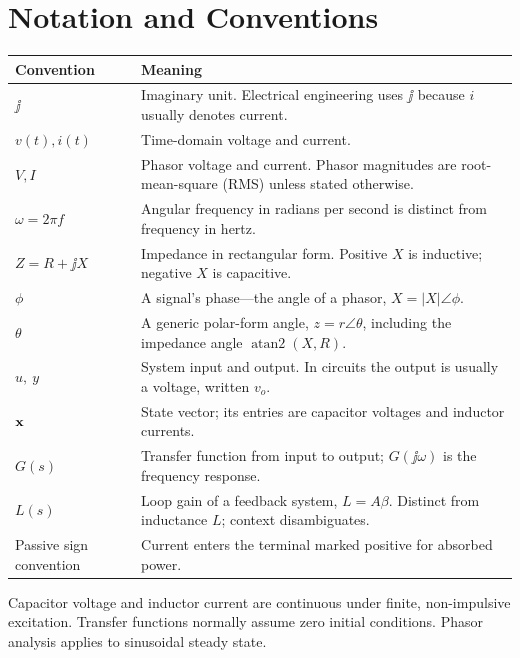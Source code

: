 \chapter*{Notation and Conventions}
\begin{tabularx}{\textwidth}{@{}L{0.28\textwidth}Y@{}}
\toprule
Convention & Meaning \\
\midrule
\(\jj\) & Imaginary unit. Electrical engineering uses \(\jj\) because \(i\) usually denotes current. \\
\(v(t), i(t)\) & Time-domain voltage and current. \\
\(V, I\) & Phasor voltage and current. Phasor magnitudes are root-mean-square (RMS) unless stated otherwise. \\
\(\omega=2\pi f\) & Angular frequency in radians per second is distinct from frequency in hertz. \\
\(Z=R+\jj X\) & Impedance in rectangular form. Positive \(X\) is inductive; negative \(X\) is capacitive. \\
\(\phi\) & A signal's phase---the angle of a phasor, \(X=|X|\angle\phi\). \\
\(\theta\) & A generic polar-form angle, \(z=r\angle\theta\), including the impedance angle \(\operatorname{atan2}(X,R)\). \\
\(u,\ y\) & System input and output. In circuits the output is usually a voltage, written \(v_o\). \\
\(\mathbf{x}\) & State vector; its entries are capacitor voltages and inductor currents. \\
\(G(s)\) & Transfer function from input to output; \(G(\jj\omega)\) is the frequency response. \\
\(L(s)\) & Loop gain of a feedback system, \(L=A\beta\). Distinct from inductance \(L\); context disambiguates. \\
Passive sign convention & Current enters the terminal marked positive for absorbed power. \\
\bottomrule
\end{tabularx}

Capacitor voltage and inductor current are continuous under finite,
non-impulsive excitation. Transfer functions normally assume zero initial
conditions. Phasor analysis applies to sinusoidal steady state.
